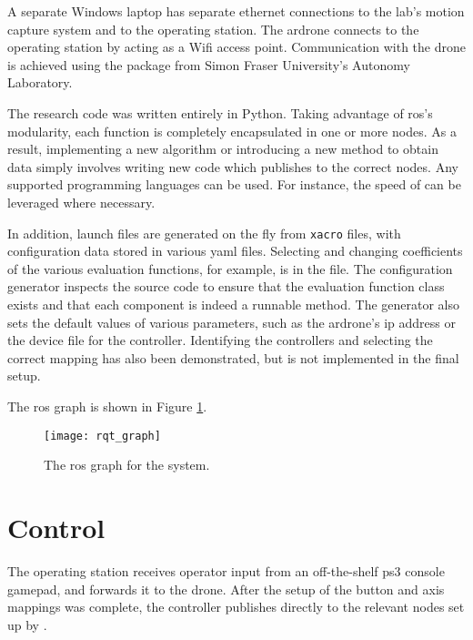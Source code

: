     A separate Windows laptop has separate ethernet connections to the lab's motion capture system and to the operating station.
    The \gls{ardrone} connects to the operating station by acting as a Wifi access point.
    Communication with the drone is achieved using the \texttt{} package from Simon Fraser University's Autonomy Laboratory.

    The research code was written entirely in Python.
    Taking advantage of \gls{ros}'s modularity, each function is completely encapsulated in one or more nodes.
    As a result, implementing a new algorithm or introducing a new method to obtain data simply involves writing new code which publishes to the correct nodes.
    Any supported programming languages can be used.
    For instance, the speed of \cpp can be leveraged where necessary.
    
    In addition, launch files are generated on the fly from \texttt{xacro} files, with configuration data stored in various \gls{yaml} files.
    Selecting and changing coefficients of the various evaluation functions, for example, is in the \texttt{} file.
    The configuration generator inspects the source code to ensure that the evaluation function class exists and that each component is indeed a runnable method.
    The generator also sets the default values of various parameters, such as the \gls{ardrone}'s \gls{ip} address or the device file for the controller.
    Identifying the controllers and selecting the correct mapping has also been demonstrated, but is not implemented in the final setup.

    The \gls{ros} graph is shown in Figure \ref{fig:rqt_graph}.
    \begin{figure}[h]
      \centering
      \texttt{[image: rqt\_graph]}
      \caption[ROS Graph]{The \gls{ros} graph for the system.}
      \label{fig:rqt_graph}
    \end{figure}

  \section{Control}
    The operating station receives operator input from an off-the-shelf \gls{ps3} console gamepad, and forwards it to the drone.
    After the setup of the button and axis mappings was complete, the controller publishes directly to the relevant \texttt{} nodes set up by \texttt{}.

